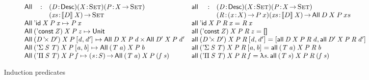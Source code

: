 \begin{figure*}

\[
\begin{array}{ll}
\stk{
\begin{array}{@{}ll}
\All{}{}{}{} : & \PITEL{\V{D}}{\Desc}
                 \PITEL{\V{X}}{\Set}
                 \PITEL{\V{P}}{\V{X} \To \Set} \\
               & \PI{\V{xs}}{\descop{D}{\V{X}}} 
                 \Set 
\end{array} \\
\All{\DId}{\V{X}}{\V{P}}{\V{x}} \mapsto \V{P}\: \V{x} \\
\All{(\DConst{\V{Z}})}{\V{X}}{\V{P}}{\V{z}} \mapsto \Unit \\
\All{(\DProd{\V{D}}{\V{D'}})}{\V{X}}{\V{P}}{\pair{\V{d}}{\V{d'}}{}} \mapsto \TIMES{\All{\V{D}}{\V{X}}{\V{P}}{\V{d}}}{\All{\V{D'}}{\V{X}}{\V{P}}{\V{d'}}} \\
\All{(\DSigma{\V{S}}{\V{T}})}{\V{X}}{\V{P}}{\pair{\V{a}}{\V{b}}{}} \mapsto \All{(\V{T}\: \V{a})}{\V{X}}{\V{P}}{\V{b}} \\
\All{(\DPi{\V{S}}{\V{T}})}{\V{X}}{\V{P}}{\V{f}} \mapsto \PI{\V{\V{s}}}{\V{S}} \All{(\V{T}\: \V{a})}{\V{X}}{\V{P}}{(\V{f}\: \V{s})}
}
&
\stk{
\begin{array}{@{}ll}
\all{}{}{}{}{} : & \PITEL{\V{D}}{\Desc}
                   \PITEL{\V{X}}{\Set}
                   \PITEL{\V{P}}{\V{X} \To \Set} \\
                 & \PITEL{\V{R}}{\PI{\V{x}}{X} P\: x}
                   \PI{\V{xs}}{\descop{D}{\V{X}}} 
                   \All{D}{X}{P}{xs} 
\end{array} \\
\all{\DId}{\V{X}}{\V{P}}{\V{R}}{\V{x}} = \V{R}\: \V{x} \\
\all{(\DConst{\V{Z}})}{\V{X}}{\V{P}}{\V{R}}{\V{z}} = \Void \\
\all{(\DProd{\V{D}}{\V{D'}})}{\V{X}}{\V{P}}{\V{R}}{\pair{\V{d}}{\V{d'}}{}} = \pair{\all{\V{D}}{\V{X}}{\V{P}}{\V{R}}{\V{d}}}{\all{\V{D'}}{\V{X}}{\V{P}}{\V{R}}{\V{d'}}}{} \\
\all{(\DSigma{\V{S}}{\V{T}})}{\V{X}}{\V{P}}{\V{R}}{\pair{\V{a}}{\V{b}}{}} = \all{(\V{T}\: \V{a})}{\V{X}}{\V{P}}{\V{R}}{\V{b}} \\
\all{(\DPi{\V{S}}{\V{T}})}{\V{X}}{\V{P}}{\V{R}}{\V{f}} = \LAM{\V{s}} \all{(\V{T}\: \V{s})}{\V{X}}{\V{P}}{\V{R}}{(\V{f}\: \V{s})}
\end{array}
}
\]

\caption{Induction predicates}
\label{fig:all-predicates}

\end{figure*}


